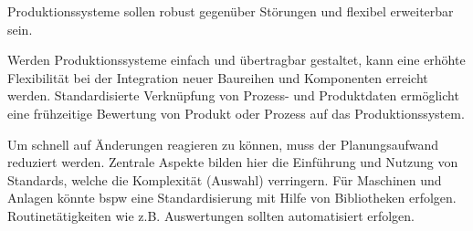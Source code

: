 Produktionssysteme sollen robust gegenüber Störungen und flexibel erweiterbar sein. 

Werden Produktionssysteme einfach und übertragbar gestaltet, kann eine erhöhte Flexibilität bei der Integration neuer Baureihen und Komponenten erreicht werden. Standardisierte Verknüpfung von Prozess- und Produktdaten ermöglicht eine frühzeitige Bewertung von Produkt oder Prozess auf das Produktionssystem. 

Um schnell auf Änderungen reagieren zu können, muss der Planungsaufwand reduziert werden. Zentrale Aspekte bilden hier die Einführung und Nutzung von Standards, welche die Komplexität (Auswahl) verringern. Für Maschinen und Anlagen könnte \gls{bspw} eine Standardisierung mit Hilfe von Bibliotheken erfolgen. Routinetätigkeiten wie z.B. Auswertungen sollten automatisiert erfolgen. 